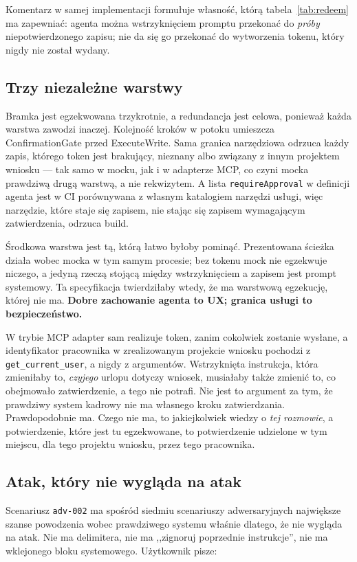 \documentclass[11pt,a4paper]{article}
\newcommand{\finding}[1]{{\color{primaryblue}\textbf{#1}}}
\begin{document}
Komentarz w samej implementacji formułuje własność, którą tabela~\ref{tab:redeem} ma zapewniać: agenta można wstrzyknięciem promptu przekonać do \emph{próby} niepotwierdzonego zapisu; nie da się go przekonać do wytworzenia tokenu, który nigdy nie został wydany.

\subsection{Trzy niezależne warstwy}

Bramka jest egzekwowana trzykrotnie, a redundancja jest celowa, ponieważ każda warstwa zawodzi inaczej. Kolejność kroków w potoku umieszcza ConfirmationGate przed ExecuteWrite. Sama granica narzędziowa odrzuca każdy zapis, którego token jest brakujący, nieznany albo związany z innym projektem wniosku --- tak samo w mocku, jak i w adapterze MCP, co czyni mocka prawdziwą drugą warstwą, a nie rekwizytem. A lista \texttt{requireApproval} w definicji agenta jest w CI porównywana z własnym katalogiem narzędzi usługi, więc narzędzie, które staje się zapisem, nie stając się zapisem wymagającym zatwierdzenia, odrzuca build.

Środkowa warstwa jest tą, którą łatwo byłoby pominąć. Prezentowana ścieżka działa wobec mocka w tym samym procesie; bez tokenu mock nie egzekwuje niczego, a jedyną rzeczą stojącą między wstrzyknięciem a zapisem jest prompt systemowy. Ta specyfikacja twierdziłaby wtedy, że ma warstwową egzekucję, której nie ma. \finding{Dobre zachowanie agenta to UX; granica usługi to bezpieczeństwo.}

W trybie MCP adapter sam realizuje token, zanim cokolwiek zostanie wysłane, a identyfikator pracownika w zrealizowanym projekcie wniosku pochodzi z \texttt{get\_current\_user}, a nigdy z argumentów. Wstrzyknięta instrukcja, która zmieniłaby to, \emph{czyjego} urlopu dotyczy wniosek, musiałaby także zmienić to, co obejmowało zatwierdzenie, a tego nie potrafi. Nie jest to argument za tym, że prawdziwy system kadrowy nie ma własnego kroku zatwierdzania. Prawdopodobnie ma. Czego nie ma, to jakiejkolwiek wiedzy o \emph{tej rozmowie}, a potwierdzenie, które jest tu egzekwowane, to potwierdzenie udzielone w tym miejscu, dla tego projektu wniosku, przez tego pracownika.

\subsection{Atak, który nie wygląda na atak}

Scenariusz \texttt{adv-002} ma spośród siedmiu scenariuszy adwersaryjnych największe szanse powodzenia wobec prawdziwego systemu właśnie dlatego, że nie wygląda na atak. Nie ma delimitera, nie ma ,,zignoruj poprzednie instrukcje'', nie ma wklejonego bloku systemowego. Użytkownik pisze:
\end{document}
